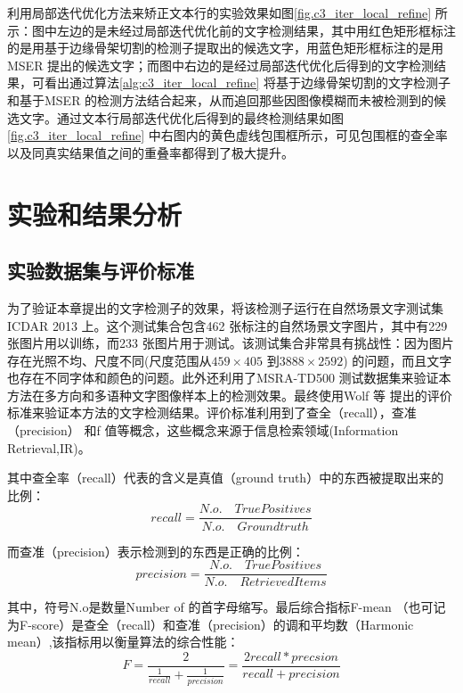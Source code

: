     利用局部迭代优化方法来矫正文本行的实验效果如图\ref{fig.c3_iter_local_refine} 所示：图中左边的是未经过局部迭代优化前的文字检测结果，其中用红色矩形框标注的是用基于边缘骨架切割的检测子提取出的候选文字，用蓝色矩形框标注的是用MSER 提出的候选文字；而图中右边的是经过局部迭代优化后得到的文字检测结果，可看出通过算法\ref{alg:c3_iter_local_refine} 将基于边缘骨架切割的文字检测子和基于MSER 的检测方法结合起来，从而追回那些因图像模糊而未被检测到的候选文字。通过文本行局部迭代优化后得到的最终检测结果如图\ref{fig.c3_iter_local_refine} 中右图内的黄色虚线包围框所示，可见包围框的查全率以及同真实结果值之间的重叠率都得到了极大提升。

    \section{实验和结果分析}

        \subsection{实验数据集与评价标准}

        为了验证本章提出的文字检测子的效果，将该检测子运行在自然场景文字测试集ICDAR 2013 上。这个测试集合包含462 张标注的自然场景文字图片，其中有229 张图片用以训练，而233 张图片用于测试。该测试集合非常具有挑战性：因为图片存在光照不均、尺度不同(尺度范围从$459 \times 405$ 到$3888 \times 2592$) 的问题，而且文字也存在不同字体和颜色的问题。此外还利用了MSRA-TD500 测试数据集来验证本方法在多方向和多语种文字图像样本上的检测效果。最终使用Wolf 等\cite{Wolf2006Object} 提出的评价标准来验证本方法的文字检测结果。评价标准利用到了查全（recall），查准（precision） 和f 值等概念，这些概念来源于信息检索领域(Information Retrieval,IR)。

        其中查全率（recall）代表的含义是真值（ground truth）中的东西被提取出来的比例：
        \begin{equation}
        recall=\frac{N.o. \quad True Positives}{N.o. \quad Ground truth}
        \end{equation}

        而查准（precision）表示检测到的东西是正确的比例：
        \begin{equation}
        precision=\frac{N.o. \quad True Positives}{N.o. \quad Retrieved Items}
        \end{equation}

        其中，符号N.o是数量Number of 的首字母缩写。最后综合指标F-mean （也可记为F-score）是查全（recall）和查准（precision）的调和平均数（Harmonic mean）,该指标用以衡量算法的综合性能：
        \begin{equation}
        F=\frac{2}{\frac{1}{recall}+\frac{1}{precision}}=\frac{2recall*precsion}{recall+precision}
        \end{equation}

